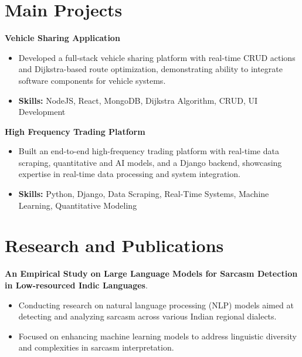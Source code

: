 \documentclass[a4paper,11pt]{article}
\begin{document}
\section{\textbf{Main Projects}}

\vspace{1mm}
  \textbf{Vehicle Sharing Application  }
\vspace{-1.5mm} %
\begin{itemize}
  \item Developed a full-stack vehicle sharing platform with real-time CRUD actions and Dijkstra-based route optimization, demonstrating ability to integrate software components for vehicle systems.
\vspace{-3mm}
  \item \textbf{Skills:} NodeJS, React, MongoDB, Dijkstra Algorithm, CRUD, UI Development
\end{itemize}


\vspace{1mm}
   \textbf{High Frequency Trading Platform }
\vspace{-1.5mm} %
\begin{itemize}
  \item Built an end-to-end high-frequency trading platform with real-time data scraping, quantitative and AI models, and a Django backend, showcasing expertise in real-time data processing and system integration.
\vspace{-3mm}
  \item \textbf{Skills:} Python, Django, Data Scraping, Real-Time Systems, Machine Learning, Quantitative Modeling
\end{itemize}



\section{\textbf{Research and Publications} \hfill }
\vspace{1mm}
  \textbf{An Empirical Study on Large Language Models for Sarcasm Detection in Low-resourced Indic Languages}.
\vspace{-1mm} %
\begin{itemize}
  \item Conducting research on natural language processing (NLP) models aimed at detecting and analyzing sarcasm across various Indian regional dialects.
\vspace{-3mm}
  \item Focused on enhancing machine learning models to address linguistic diversity and complexities in sarcasm interpretation.
\end{itemize}
\end{document}
